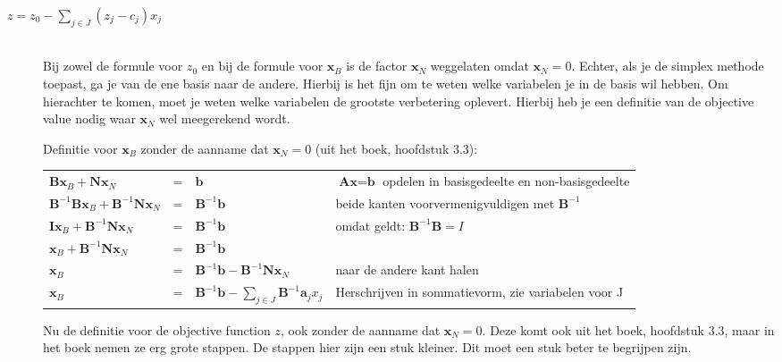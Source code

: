 \documentclass[10pt,a4paper]{article}
\begin{document}
\begin{description}
\item[$z = z_0 - \displaystyle\sum\limits_{j \in J} (z_j - c_j)x_j $] \hfill \\
Bij zowel de formule voor $z_0$ en bij de formule voor $\textbf{x}_B$ is de factor $\textbf{x}_N$ weggelaten omdat $\textbf{x}_N = 0$. Echter, als je de simplex methode toepast, ga je van de ene basis naar de andere. Hierbij is het fijn om te weten welke variabelen je in de basis wil hebben. Om hierachter te komen, moet je weten welke variabelen de grootste verbetering oplevert. Hierbij heb je een definitie van de objective value nodig waar $\textbf{x}_N$ wel meegerekend wordt.

Definitie voor $\textbf{x}_B$ zonder de aanname dat $\textbf{x}_N = 0$ (uit het boek, hoofdstuk 3.3):

\begin{tabular}{l l l l}
$\textbf{Bx}_B + \textbf{Nx}_N$ & = & $\textbf{b}$ & $\textbf{Ax} = \textbf{b}$ opdelen in basisgedeelte en non-basisgedeelte \\
$\textbf{B}^ {-1}\textbf{Bx}_B + \textbf{B}^ {-1}\textbf{Nx}_N$ & = & $\textbf{B}^ {-1}\textbf{b}$ & beide kanten voorvermenigvuldigen met $\textbf{B}^{-1}$ \\
$\textbf{Ix}_B + \textbf{B}^ {-1}\textbf{Nx}_N$ & = & $\textbf{B}^ {-1}\textbf{b}$ & omdat geldt: $\textbf{B}^{-1}\textbf{B} = I$ \\
$\textbf{x}_B + \textbf{B}^ {-1}\textbf{Nx}_N$ & = & $\textbf{B}^ {-1}\textbf{b}$ & \\
$\textbf{x}_B$ & = & $\textbf{B}^{-1}\textbf{b} - \textbf{B}^ {-1}\textbf{Nx}_N$ & naar de andere kant halen \\
$\textbf{x}_B$ & = & $\textbf{B}^{-1}\textbf{b} - \displaystyle\sum\limits_{j \in J}\textbf{B}^ {-1}\textbf{a}_j x_j$ & Herschrijven in sommatievorm, zie variabelen voor J \\
\end{tabular}

Nu de definitie voor de objective function $z$, ook zonder de aanname dat $\textbf{x}_N = 0$. Deze komt ook uit het boek, hoofdstuk 3.3, maar in het boek nemen ze erg grote stappen. De stappen hier zijn een stuk kleiner. Dit moet een stuk beter te begrijpen zijn.


\end{description}
\end{document}
